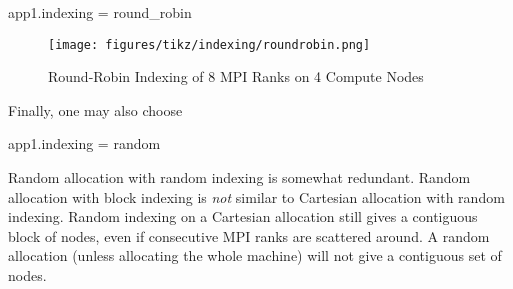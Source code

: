 \begin{ViFile}
app1.indexing = round_robin
\end{ViFile}
\begin{figure}[h]
\centering
\texttt{[image: figures/tikz/indexing/roundrobin.png]}
\caption{Round-Robin Indexing of 8 MPI Ranks on 4 Compute Nodes}
\label{fig:indexing:round_robin}
\end{figure}
Finally, one may also choose

\begin{ViFile}
app1.indexing = random
\end{ViFile}
Random allocation with random indexing is somewhat redundant.  
Random allocation with block indexing is \emph{not} similar to Cartesian allocation with random indexing.
Random indexing on a Cartesian allocation still gives a contiguous block of nodes,
even if consecutive MPI ranks are scattered around.
A random allocation (unless allocating the whole machine) will not give a contiguous set of nodes.
